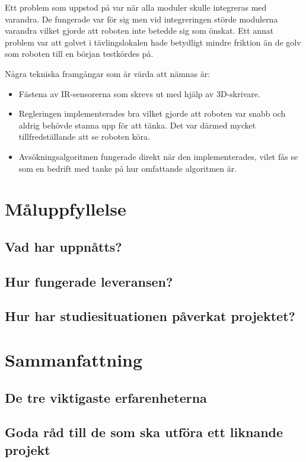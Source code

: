 \documentclass[11pt]{article}
\begin{document}



Ett problem som uppstod på var när alla moduler skulle integreras med varandra. De fungerade var för sig men vid integreringen störde modulerna varandra vilket gjorde att roboten inte betedde sig som önskat. Ett annat problem var att golvet i tävlingslokalen hade betydligt mindre friktion än de golv som roboten till en början testkördes på. 

Några tekniska framgångar som är värda att nämnas är:
\begin{itemize}
\item Fästena av IR-sensorerna som skrevs ut med hjälp av 3D-skrivare.
\item Regleringen implementerades bra vilket gjorde att roboten var snabb och aldrig behövde stanna upp för att tänka. Det var därmed mycket tillfredställande att se roboten köra. 
\item Avsökningsalgoritmen fungerade direkt när den implementerades, vilet fås se som en bedrift med tanke på hur omfattande algoritmen är. 
\end{itemize} 

\section{Måluppfyllelse}

\subsection{Vad har uppnåtts?}

\subsection{Hur fungerade leveransen?}

\subsection{Hur har studiesituationen påverkat projektet?}


\section{Sammanfattning}

\subsection{De tre viktigaste erfarenheterna}

\subsection{Goda råd till de som ska utföra ett liknande projekt}
\end{document}
